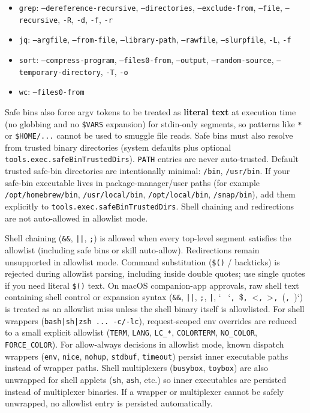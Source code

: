 \begin{itemize}
  \item \texttt{grep}: \texttt{--dereference-recursive}, \texttt{--directories}, \texttt{--exclude-from}, \texttt{--file}, \texttt{--recursive}, \texttt{-R}, \texttt{-d}, \texttt{-f}, \texttt{-r}
  \item \texttt{jq}: \texttt{--argfile}, \texttt{--from-file}, \texttt{--library-path}, \texttt{--rawfile}, \texttt{--slurpfile}, \texttt{-L}, \texttt{-f}
  \item \texttt{sort}: \texttt{--compress-program}, \texttt{--files0-from}, \texttt{--output}, \texttt{--random-source}, \texttt{--temporary-directory}, \texttt{-T}, \texttt{-o}
  \item \texttt{wc}: \texttt{--files0-from}
\end{itemize}


Safe bins also force argv tokens to be treated as \textbf{literal text} at execution time (no globbing
and no \texttt{\$VARS} expansion) for stdin-only segments, so patterns like \texttt{*} or \texttt{\$HOME/...} cannot be
used to smuggle file reads.
Safe bins must also resolve from trusted binary directories (system defaults plus optional
\texttt{tools.exec.safeBinTrustedDirs}). \texttt{PATH} entries are never auto-trusted.
Default trusted safe-bin directories are intentionally minimal: \texttt{/bin}, \texttt{/usr/bin}.
If your safe-bin executable lives in package-manager/user paths (for example
\texttt{/opt/homebrew/bin}, \texttt{/usr/local/bin}, \texttt{/opt/local/bin}, \texttt{/snap/bin}), add them explicitly
to \texttt{tools.exec.safeBinTrustedDirs}.
Shell chaining and redirections are not auto-allowed in allowlist mode.

Shell chaining (\texttt{\&\&}, \texttt{||}, \texttt{;}) is allowed when every top-level segment satisfies the allowlist
(including safe bins or skill auto-allow). Redirections remain unsupported in allowlist mode.
Command substitution (\texttt{\$()} / backticks) is rejected during allowlist parsing, including inside
double quotes; use single quotes if you need literal \texttt{\$()} text.
On macOS companion-app approvals, raw shell text containing shell control or expansion syntax
(\texttt{\&\&}, \texttt{||}, \texttt{;}, \texttt{|}, `\texttt{ } `\texttt{, }\$\texttt{, }<\texttt{, }>\texttt{, }(\texttt{, })`) is treated as an allowlist miss unless
the shell binary itself is allowlisted.
For shell wrappers (\texttt{bash|sh|zsh ... -c/-lc}), request-scoped env overrides are reduced to a
small explicit allowlist (\texttt{TERM}, \texttt{LANG}, \texttt{LC\_*}, \texttt{COLORTERM}, \texttt{NO\_COLOR}, \texttt{FORCE\_COLOR}).
For allow-always decisions in allowlist mode, known dispatch wrappers
(\texttt{env}, \texttt{nice}, \texttt{nohup}, \texttt{stdbuf}, \texttt{timeout}) persist inner executable paths instead of wrapper
paths. Shell multiplexers (\texttt{busybox}, \texttt{toybox}) are also unwrapped for shell applets (\texttt{sh}, \texttt{ash},
etc.) so inner executables are persisted instead of multiplexer binaries. If a wrapper or
multiplexer cannot be safely unwrapped, no allowlist entry is persisted automatically.

